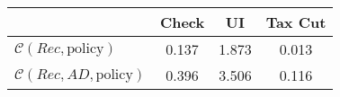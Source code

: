 \begin{tabular}{@{}lccc@{}} 
\toprule 
                          & Check      & UI    & Tax Cut    \\  \midrule 
$\mathcal{C}(Rec,\text{policy})$ & 0.137  & 1.873  & 0.013     \\ 
$\mathcal{C}(Rec, AD,\text{policy})$ & 0.396  & 3.506  & 0.116     \\ 
\end{tabular}  
